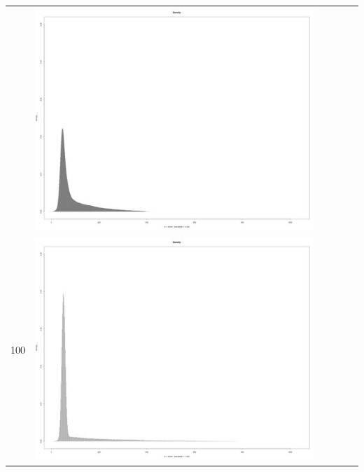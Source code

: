 \begin{table}[htbp]
{\begin{tabular}{l | ccccc}
\begin{minipage}{.15\textwidth}
    				\end{minipage}
    			   & \begin{minipage}{.15\textwidth}
     			 	\includegraphics[width=\linewidth]{images/mema-dens-graph/N6}
    				 \end{minipage}\\		
		100	   & \begin{minipage}{.15\textwidth}
     			 	\includegraphics[width=\linewidth]{images/mema-dens-graph/N3}
    				 \end{minipage}
    			   & \begin{minipage}{.15\textwidth}

\end{minipage}
\end{tabular}}
\end{table}
